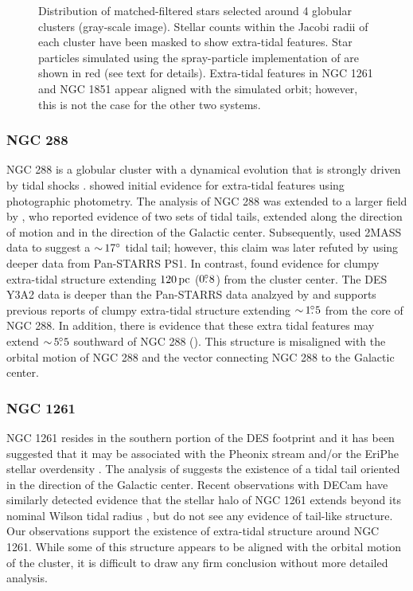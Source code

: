 \documentclass[twocolumn]{aastex61}
\begin{document}
\begin{figure}[t]
  \caption{
Distribution of matched-filtered stars selected around 4 globular clusters (gray-scale image). 
Stellar counts within the Jacobi radii of each cluster have been masked to show extra-tidal features.
Star particles simulated using the spray-particle implementation of \citet{Kuepper:2012} are shown in red (see text for details).
Extra-tidal features in NGC 1261 and NGC 1851 appear aligned with the simulated orbit; however, this is not the case for the other two systems.
}
\label{fig:globulars}
\end{figure}



\subsubsection{NGC 288}
\label{sec:ngc288}

NGC 288 is a globular cluster with a dynamical evolution that is strongly driven by tidal shocks \citep{Gnedin:1997}.
\citet{Grillmair:1995} showed initial evidence for extra-tidal features using photographic photometry. 
The analysis of NGC 288 was extended to a larger field by \citet{Leon:2000}, who reported evidence of two sets of tidal tails, extended along the direction of motion and in the direction of the Galactic center.
Subsequently, \citet{Grillmair:2004} used 2MASS data to suggest a $ {\sim}\, 17{}^{\circ}$ tidal tail; however, this claim was later refuted by \citet{Piatti:2018} using deeper data from Pan-STARRS PS1.
In contrast, \citet{Piatti:2018} found evidence for clumpy extra-tidal structure extending $120\mathrm{\,pc}$ ($0\mbox{$.\!\!^\circ$}8$) from the cluster center.
The DES Y3A2 data is deeper than the Pan-STARRS data analzyed by \citet{Piatti:2018} and supports previous reports of clumpy extra-tidal structure extending $ {\sim}\, 1\mbox{$.\!\!^\circ$}5$ from the core of NGC 288.
In addition, there is evidence that these extra tidal features may extend $ {\sim}\, 5\mbox{$.\!\!^\circ$}5$ southward of NGC 288 ().
This structure is misaligned with the orbital motion of NGC 288 and the vector connecting NGC 288 to the Galactic center.

\subsubsection{NGC 1261}
\label{sec:ngc1261}

NGC 1261 resides in the southern portion of the DES footprint and it has been suggested that it may be associated with the Pheonix stream \citep{Balbinot:2016} and/or the EriPhe stellar overdensity \citep{Li:2016}.
The analysis of \citet{Leon:2000} suggests the existence of a tidal tail oriented in the direction of the Galactic center.
Recent observations with DECam have similarly detected evidence that the stellar halo of NGC 1261 extends beyond its nominal Wilson tidal radius \citep{Kuzma:2018,Carballo-Bello:2018}, but do not see any evidence of tail-like structure.
Our observations support the existence of extra-tidal structure around NGC 1261. 
While some of this structure appears to be aligned with the orbital motion of the cluster, it is difficult to draw any firm conclusion without more detailed analysis.
\end{document}
